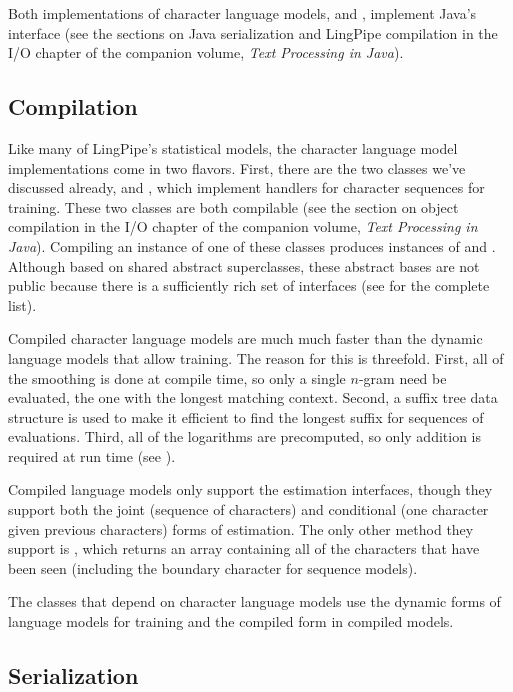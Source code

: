 Both implementations of character language models,
 and , implement Java's
 interface (see the sections on Java serialization
and LingPipe compilation in the I/O chapter of the companion volume,
{\it Text Processing in Java}).

\subsection{Compilation}

Like many of LingPipe's statistical models, the character language
model implementations come in two flavors.  First, there are the two
classes we've discussed already,  and
, which implement handlers for character
sequences for training.  These two classes are both compilable (see
the section on object compilation in the I/O chapter of the companion volume, {\it 
Text Processing in Java}).
Compiling an instance of one of these classes
produces instances of  and
.  Although based on shared abstract
superclasses, these abstract bases are not public because there is a
sufficiently rich set of interfaces (see 
for the complete list).

Compiled character language models are much much faster than the
dynamic language models that allow training.  The reason for this is
threefold.  First, all of the smoothing is done at compile time, so
only a single $n$-gram need be evaluated, the one with the longest
matching context.  Second, a suffix tree data structure is used to
make it efficient to find the longest suffix for sequences of
evaluations.  Third, all of the logarithms are precomputed, so only
addition is required at run time (see ).  

Compiled language models only support the estimation interfaces,
though they support both the joint (sequence of characters) and
conditional (one character given previous characters) forms of
estimation.  The only other method they support is
, which returns an array containing all of
the characters that have been seen (including the boundary character
for sequence models).

The classes that depend on character language models use the dynamic
forms of language models for training and the compiled form in compiled
models.

\subsection{Serialization}

